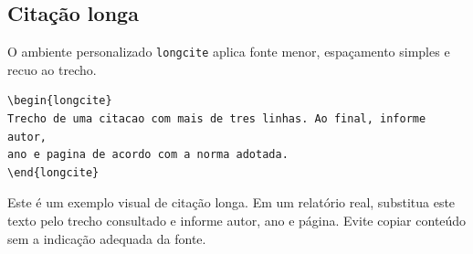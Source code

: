 \subsection{Citação longa}

O ambiente personalizado \texttt{longcite} aplica fonte menor, espaçamento
simples e recuo ao trecho.

\begin{lstlisting}[language={[LaTeX]TeX},caption={Citação longa}]
\begin{longcite}
Trecho de uma citacao com mais de tres linhas. Ao final, informe autor,
ano e pagina de acordo com a norma adotada.
\end{longcite}
\end{lstlisting}

\begin{longcite}
Este é um exemplo visual de citação longa. Em um relatório real, substitua este
texto pelo trecho consultado e informe autor, ano e página. Evite copiar conteúdo
sem a indicação adequada da fonte.
\end{longcite}
